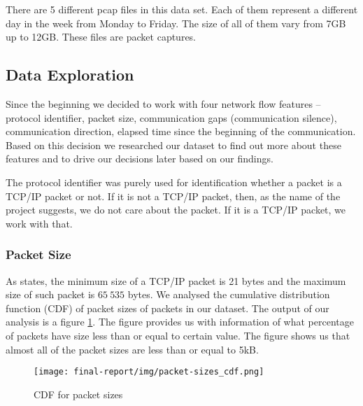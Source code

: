 \documentclass{article}
\begin{document}
    There are 5 different pcap files in this data set. Each of them represent a different day in the week from Monday to Friday. The size of all of them vary from 7GB up to 12GB. These files are packet captures.


    \subsection{Data Exploration}\label{sec-dataset-exploration}
    Since the beginning we decided to work with four network flow features -- protocol identifier, packet size, communication gaps (communication silence), communication direction, elapsed time since the beginning of the communication. Based on this decision we researched our dataset to find out more about these features and to drive our decisions later based on our findings.

    The protocol identifier was purely used for identification whether a packet is a TCP/IP packet or not. If it is not a TCP/IP packet, then, as the name of the project suggests, we do not care about the packet. If it is a TCP/IP packet, we work with that.

    \subsubsection{Packet Size}
    As \cite{oreilly-tcp} states, the minimum size of a TCP/IP packet is 21 bytes and the maximum size of such packet is $65\ 535$ bytes. We analysed the cumulative distribution function (CDF) of packet sizes of packets in our dataset. The output of our analysis is a figure \ref{fig-cdf-packet-sizes}. The figure provides us with information of what percentage of packets have size less than or equal to certain value. The figure shows us that almost all of the packet sizes are less than or equal to 5kB.

    \begin{figure}[h!]
        \centering
        \texttt{[image: final-report/img/packet-sizes\_cdf.png]}
        \caption{CDF for packet sizes}
        \label{fig-cdf-packet-sizes}
    \end{figure}
\end{document}
